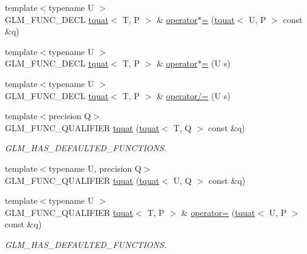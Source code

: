 \begin{DoxyCompactItemize}
\item 
{\footnotesize template$<$typename U $>$ }\\G\+L\+M\+\_\+\+F\+U\+N\+C\+\_\+\+D\+E\+C\+L \hyperlink{structglm_1_1tquat}{tquat}$<$ T, P $>$ \& \hyperlink{structglm_1_1tquat_a3aaba279045f689985499e21aafd1ab8}{operator$\ast$=} (\hyperlink{structglm_1_1tquat}{tquat}$<$ U, P $>$ const \&q)
\item 
{\footnotesize template$<$typename U $>$ }\\G\+L\+M\+\_\+\+F\+U\+N\+C\+\_\+\+D\+E\+C\+L \hyperlink{structglm_1_1tquat}{tquat}$<$ T, P $>$ \& \hyperlink{structglm_1_1tquat_ac92bf2dc48e2c7e3f4976b25a5daf78a}{operator$\ast$=} (U s)
\item 
{\footnotesize template$<$typename U $>$ }\\G\+L\+M\+\_\+\+F\+U\+N\+C\+\_\+\+D\+E\+C\+L \hyperlink{structglm_1_1tquat}{tquat}$<$ T, P $>$ \& \hyperlink{structglm_1_1tquat_ab9348510c32247974addf29b37304b2b}{operator/=} (U s)
\item 
{\footnotesize template$<$precision Q$>$ }\\G\+L\+M\+\_\+\+F\+U\+N\+C\+\_\+\+Q\+U\+A\+L\+I\+F\+I\+E\+R \hyperlink{structglm_1_1tquat_a1462c0039d696557ba42636623b80c63}{tquat} (\hyperlink{structglm_1_1tquat}{tquat}$<$ T, Q $>$ const \&q)
\begin{DoxyCompactList}\small\item\em G\+L\+M\+\_\+\+H\+A\+S\+\_\+\+D\+E\+F\+A\+U\+L\+T\+E\+D\+\_\+\+F\+U\+N\+C\+T\+I\+O\+N\+S. \end{DoxyCompactList}\item 
{\footnotesize template$<$typename U, precision Q$>$ }\\G\+L\+M\+\_\+\+F\+U\+N\+C\+\_\+\+Q\+U\+A\+L\+I\+F\+I\+E\+R \hyperlink{structglm_1_1tquat_a57b7361c175efbbeb05d551473cc63d8}{tquat} (\hyperlink{structglm_1_1tquat}{tquat}$<$ U, Q $>$ const \&q)
\item 
{\footnotesize template$<$typename U $>$ }\\G\+L\+M\+\_\+\+F\+U\+N\+C\+\_\+\+Q\+U\+A\+L\+I\+F\+I\+E\+R \hyperlink{structglm_1_1tquat}{tquat}$<$ T, P $>$ \& \hyperlink{structglm_1_1tquat_a280d36cd56dabfc93402adb201e87e63}{operator=} (\hyperlink{structglm_1_1tquat}{tquat}$<$ U, P $>$ const \&q)
\begin{DoxyCompactList}\small\item\em G\+L\+M\+\_\+\+H\+A\+S\+\_\+\+D\+E\+F\+A\+U\+L\+T\+E\+D\+\_\+\+F\+U\+N\+C\+T\+I\+O\+N\+S. \end{DoxyCompactList}\item 

\end{DoxyCompactItemize}
